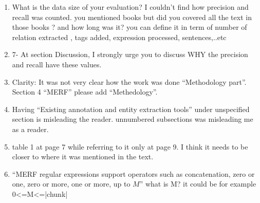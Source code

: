 \begin{enumerate}[leftmargin=0mm,label=\bfseries CommentR3.\arabic*]

\item \label{Review.3.26}
What is the data size of your evaluation? 
I couldn't find how precision and recall was counted. 
you mentioned books but did you covered all the text in those 
books ? and how long was it? you can define it in term of 
number of relation extracted , tags added, expression processed, 
sentences,..etc



\item \label{Review.3.27}
7- At section Discussion, I strongly urge you to discuss 
WHY the precision and recall have these values.


\item \label{Review.3.28}
Clarity:  
It was not very clear how the work was done 
``Methodology part''. 
Section 4 ``MERF'' please add ``Methedology''.



\item \label{Review.3.29}
Having ``Existing annotation and entity extraction tools'' 
under unspecified section is misleading the reader. 
unnumbered subsections was misleading me as a reader. 


\item \label{Review.3.30}
table 1 at page 7 while referring to it only at page 9. 
I think it needs to be closer to where it was mentioned in the text. 


\item \label{Review.3.31}
``MERF regular expressions support operators such as concatenation, zero or one, zero or more, one or more, up to $M$” what is M? 
it could be for example 0<=M<=|chunk| 



\end{enumerate}
